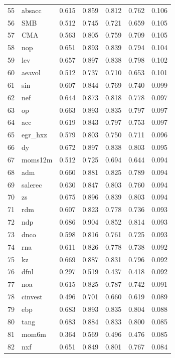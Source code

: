 \begin{footnotesize}
\begin{longtable}{rl|c|c|c|c|c}
		55 & absacc & 0.615 & 0.859 & 0.812 & 0.762 & 0.106 \\ 
		56 & SMB & 0.512 & 0.745 & 0.721 & 0.659 & 0.105 \\ 
		57 & CMA & 0.563 & 0.805 & 0.759 & 0.709 & 0.105 \\ 
		58 & nop & 0.651 & 0.893 & 0.839 & 0.794 & 0.104 \\ 
		59 & lev & 0.657 & 0.897 & 0.838 & 0.798 & 0.102 \\ 
		60 & aeavol & 0.512 & 0.737 & 0.710 & 0.653 & 0.101 \\ 
		61 & sin & 0.607 & 0.844 & 0.769 & 0.740 & 0.099 \\ 
		62 & nef & 0.644 & 0.873 & 0.818 & 0.778 & 0.097 \\ 
		63 & op & 0.663 & 0.893 & 0.835 & 0.797 & 0.097 \\ 
		64 & acc & 0.619 & 0.843 & 0.797 & 0.753 & 0.097 \\ 
		65 & egr\_hxz & 0.579 & 0.803 & 0.750 & 0.711 & 0.096 \\ 
		66 & dy & 0.672 & 0.897 & 0.838 & 0.803 & 0.095 \\ 
		67 & moms12m & 0.512 & 0.725 & 0.694 & 0.644 & 0.094 \\ 
		68 & adm & 0.660 & 0.881 & 0.825 & 0.789 & 0.094 \\ 
		69 & salerec & 0.630 & 0.847 & 0.803 & 0.760 & 0.094 \\ 
		70 & zs & 0.675 & 0.896 & 0.839 & 0.803 & 0.094 \\ 
		71 & rdm & 0.607 & 0.823 & 0.778 & 0.736 & 0.093 \\ 
		72 & ndp & 0.686 & 0.904 & 0.852 & 0.814 & 0.093 \\ 
		73 & dnco & 0.598 & 0.816 & 0.761 & 0.725 & 0.093 \\ 
		74 & rna & 0.611 & 0.826 & 0.778 & 0.738 & 0.092 \\ 
		75 & kz & 0.669 & 0.887 & 0.831 & 0.796 & 0.092 \\ 
		76 & dfnl & 0.297 & 0.519 & 0.437 & 0.418 & 0.092 \\ 
		77 & noa & 0.615 & 0.825 & 0.787 & 0.742 & 0.091 \\ 
		78 & cinvest & 0.496 & 0.701 & 0.660 & 0.619 & 0.089 \\ 
		79 & ebp & 0.683 & 0.893 & 0.835 & 0.804 & 0.088 \\ 
		80 & tang & 0.683 & 0.884 & 0.833 & 0.800 & 0.085 \\ 
		81 & mom6m & 0.364 & 0.569 & 0.496 & 0.476 & 0.085 \\ 
		82 & nxf & 0.651 & 0.849 & 0.801 & 0.767 & 0.084 \\ 

\end{longtable}
\end{footnotesize}
